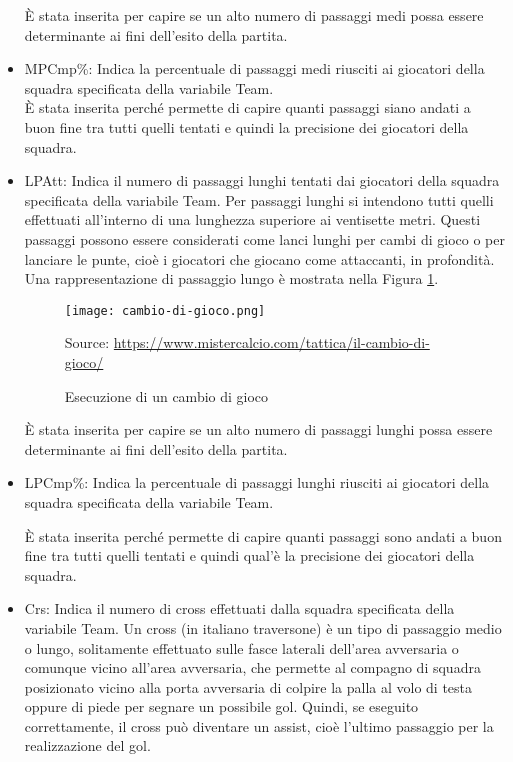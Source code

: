 \begin{itemize}
	È stata inserita per capire se un alto numero di passaggi medi possa essere determinante ai fini dell'esito della partita. 
	
	\item \textsf{MPCmp\%}: Indica la percentuale di passaggi medi riusciti ai giocatori della squadra specificata della variabile \textsf{Team}.\\ 
	
	È stata inserita perché permette di capire quanti passaggi siano andati a buon fine tra tutti quelli tentati e quindi la precisione dei giocatori della squadra.
	\item \textsf{LPAtt}: Indica il numero di passaggi lunghi tentati dai giocatori della squadra specificata della variabile \textsf{Team}. Per passaggi lunghi si intendono tutti quelli effettuati all'interno di una lunghezza superiore ai ventisette metri. Questi passaggi possono essere considerati come lanci lunghi per cambi di gioco o per lanciare le punte, cioè i giocatori che giocano come attaccanti, in profondità. Una rappresentazione di passaggio lungo è mostrata nella Figura \ref{fig:cambio}.
	\begin{figure}[ht]
		\begin{center}
			\texttt{[image: cambio-di-gioco.png]}
			\caption{Esecuzione di un cambio di gioco} \label{fig:cambio}
			Source: \url{https://www.mistercalcio.com/tattica/il-cambio-di-gioco/}
		\end{center}
	\end{figure}
	
	È stata inserita per capire se un alto numero di passaggi lunghi possa essere determinante ai fini dell'esito della partita.
	
	\item \textsf{LPCmp\%}: Indica la percentuale di passaggi lunghi riusciti ai giocatori della squadra specificata della variabile \textsf{Team}. 
	
	È stata inserita perché permette di capire quanti passaggi sono andati a buon fine tra tutti quelli tentati e quindi qual'è la precisione dei giocatori della squadra.
	
	\item \textsf{Crs}: Indica il numero di cross effettuati dalla squadra specificata della variabile \textsf{Team}. Un cross (in italiano traversone) è un tipo di passaggio medio o lungo, solitamente effettuato sulle fasce laterali dell'area avversaria o comunque vicino all'area avversaria, che permette al compagno di squadra posizionato vicino alla porta avversaria di colpire la palla al volo di testa oppure di piede per segnare un possibile gol. Quindi, se eseguito correttamente, il cross può diventare un assist, cioè l'ultimo passaggio per la realizzazione del gol. 
	

\end{itemize}
